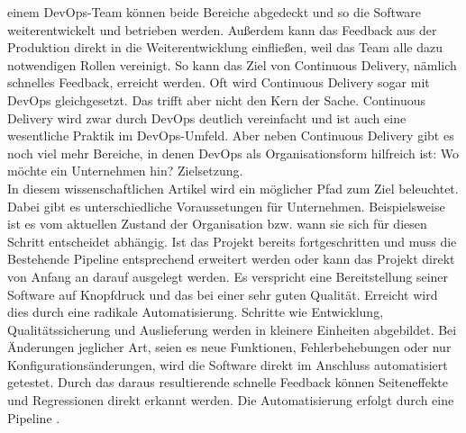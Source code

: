  einem DevOps-Team können beide Bereiche abgedeckt und so die Software weiterentwickelt und betrieben werden. Außerdem kann das Feedback aus der Produktion direkt in die Weiterentwicklung einfließen, weil das Team alle dazu notwendigen Rollen vereinigt. So kann das Ziel von Continuous Delivery, nämlich schnelles Feedback, erreicht werden. Oft wird Continuous Delivery sogar mit DevOps gleichgesetzt. Das trifft aber nicht den Kern der Sache. Continuous Delivery wird zwar durch DevOps deutlich vereinfacht und ist auch eine wesentliche Praktik im DevOps-Umfeld. Aber neben Continuous Delivery gibt es noch viel mehr Bereiche, in denen DevOps als Organisationsform hilfreich ist: Wo möchte ein Unternehmen hin? Zielsetzung. \\In diesem wissenschaftlichen Artikel wird ein möglicher Pfad zum Ziel beleuchtet. Dabei gibt es unterschiedliche Voraussetungen für Unternehmen. Beispielsweise ist es vom aktuellen Zustand der Organisation bzw. wann sie sich für diesen Schritt entscheidet abhängig. Ist das Projekt bereits fortgeschritten und muss die Bestehende Pipeline entsprechend erweitert werden oder kann das Projekt direkt von Anfang an darauf ausgelegt werden.
Es verspricht eine Bereitstellung seiner Software auf Knopfdruck und das bei einer sehr guten Qualität. Erreicht wird dies durch eine radikale Automatisierung. Schritte wie Entwicklung, Qualitätssicherung und Auslieferung werden in kleinere Einheiten abgebildet. Bei Änderungen jeglicher Art, seien es neue Funktionen, Fehlerbehebungen oder nur Konfigurationsänderungen, wird die Software direkt im Anschluss automatisiert getestet. Durch das daraus resultierende schnelle Feedback können Seiteneffekte und Regressionen direkt erkannt werden. Die Automatisierung erfolgt durch eine Pipeline \cite{Birk.2014}. 

